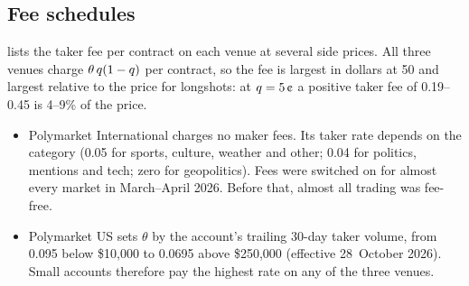 \subsection{Fee schedules}\label{app:wallets-fees}
 lists the taker fee per contract on each venue at several side prices. All
three venues charge $\theta\,q(1-q)$ per contract, so the fee is largest in dollars at
50\cents{} and largest relative to the price for longshots: at $\q=5\cents$ a positive taker fee of
0.19--0.45\cents{} is 4--9\% of the price.
\begin{itemize}
  \item Polymarket International charges no maker fees. Its taker rate depends on the category
    (0.05 for sports, culture, weather and other; 0.04 for politics, mentions and tech; zero for
    geopolitics). Fees were switched on for almost every market in March--April 2026. Before that,
    almost all trading was fee-free.
  \item Polymarket US sets $\theta$ by the account's trailing 30-day taker volume, from 0.095
    below \$10{,}000 to 0.0695 above \$250{,}000 (effective 28~October 2026). Small accounts
    therefore pay the highest rate on any of the three venues.
\end{itemize}
